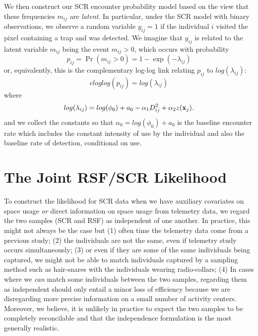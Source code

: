 \documentclass[12pt]{article}
\begin{document}
We then construct our SCR encounter probability model based on the
view that these frequencies $m_{ij}$ are {\it latent}. In particular,
under the SCR model with binary observations,
 we observe a random variable
$y_{ij} = 1$  if the individual $i$ visited the pixel
containing a trap and was detected.
We imagine that $y_{ij}$ is related to the latent variable $m_{ij}$ being the
event $m_{ij}>0$, which occurs with probability
\[
 p_{ij} = \Pr(m_{ij}>0) =  1-\exp(- \lambda_{ij})
\]
or, equivalently, this is the complementary log-log link relating
$p_{ij}$ to $log(\lambda_{ij})$:
\[
 cloglog(p_{ij}) = log(\lambda_{ij})
\]
where
\[
 log(\lambda_{ij}) = log(\phi_{0}) + a_{0} -\alpha_{1} D_{ij}^{2} +  \alpha_{2} z({\bf x}_{j}).
\]
and we collect the constants so that $\alpha_{0} = log(\phi_{0}) +
a_{0}$ is the
 baseline encounter rate which includes
the constant intensity of use by the individual and also the baseline
rate of detection, conditional on use.


\section{The Joint RSF/SCR Likelihood}

To construct the likelihood for SCR data when we have auxiliary
covariates on space usage {\it or} direct information on space usage
from telemetry data, we regard the two samples (SCR and RSF) as
independent of one another. In practice, this might not always be the
case but (1) often time the telemetry data come from a previous study;
(2) the individuals are not the same, even if telemetry study occurs simultaneously; (3) or even if they are
some of the same individuals being captured, we might not be able to
match individuals captured by a sampling method such as hair-snares
with the individuals wearing radio-collars; (4) In cases where we {\it
  can} match some individuals between the two samples, regarding them as
independent should only entail a minor
loss of efficiency
because we are disregarding more precise information on a small number
of activity centers. Moreover, we believe, it is unlikely in practice
to expect the two samples to be completely reconcilable and that the
independence formulation is the most generally realistic.
\end{document}
